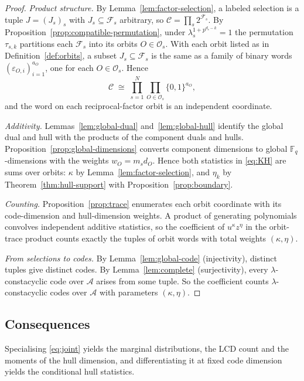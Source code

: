 \documentclass[10pt,a4paper]{article}
\newcommand{\F}{\mathbb F}
\newcommand{\A}{\mathcal A}
\newcommand{\Fs}{\mathcal F_s}
\newcommand{\Os}{\mathcal O_s}
\numberwithin{equation}{section}
\theoremstyle{plain}
\theoremstyle{definition}
\theoremstyle{remark}
\begin{document}
\begin{proof}
\emph{Product structure.} By Lemma~\ref{lem:factor-selection}, a labeled
selection is a tuple $J=(J_s)_s$ with $J_s\subseteq\Fs$ arbitrary, so
$\mathscr C=\prod_s 2^{\Fs}$. By Proposition~\ref{prop:compatible-permutation},
under $\lambda_s^{1+p^{d_s-k}}=1$ the permutation $\tau_{s,k}$ partitions each
$\Fs$ into its orbits $O\in\Os$. With each orbit listed as in
Definition~\ref{def:orbits}, a subset $J_s\subseteq\Fs$ is the same as a family of
binary words $(\varepsilon_{O,i})_{i=1}^{a_O}$, one for each $O\in\Os$. Hence
\[
\mathscr C\;\cong\;\prod_{s=1}^{N}\prod_{O\in\Os}\{0,1\}^{a_O},
\]
and the word on each reciprocal-factor orbit is an independent coordinate.

\emph{Additivity.} Lemmas~\ref{lem:global-dual} and~\ref{lem:global-hull}
identify the global dual and hull with the products of the component duals and
hulls. Proposition~\ref{prop:global-dimensions} converts component dimensions to
global $\F_q$-dimensions with the weights $w_O=m_sd_O$. Hence both statistics in
\eqref{eq:KH} are sums over orbits: $\kappa$ by
Lemma~\ref{lem:factor-selection}, and $\eta_k$ by
Theorem~\ref{thm:hull-support} with Proposition~\ref{prop:boundary}.

\emph{Counting.} Proposition~\ref{prop:trace} enumerates each orbit coordinate
with its code-dimension and hull-dimension weights. A product of generating
polynomials convolves independent additive statistics, so the coefficient of
$u^{\kappa}z^{\eta}$ in the orbit-trace product counts exactly the tuples of orbit
words with total weights $(\kappa,\eta)$.

\emph{From selections to codes.} By Lemma~\ref{lem:global-code} (injectivity),
distinct tuples give distinct codes. By Lemma~\ref{lem:complete} (surjectivity),
every $\lambda$-constacyclic code over $\A$ arises from some tuple. So the
coefficient counts $\lambda$-constacyclic codes over $\A$ with parameters
$(\kappa,\eta)$.
\end{proof}

\subsection{Consequences}\label{sec:consequences}

Specialising \eqref{eq:joint} yields the marginal distributions, the LCD count and
the moments of the hull dimension, and differentiating it at fixed code dimension
yields the conditional hull statistics.
\end{document}

